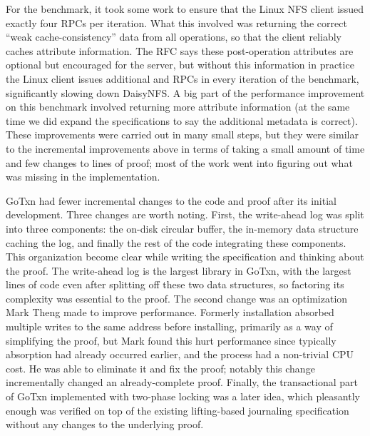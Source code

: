 For the  benchmark, it took some work to ensure that the Linux NFS
client issued exactly four RPCs per iteration. What this involved was returning
the correct ``weak cache-consistency'' data from all operations, so that the
client reliably caches attribute information. The RFC says these post-operation
attributes are optional but encouraged for the server, but without this
information in practice the Linux client issues additional  and
 RPCs in every iteration of the benchmark, significantly slowing down DaisyNFS.
A big part of the
performance improvement on this benchmark involved returning more
attribute information (at the same time we did expand the specifications to say
the additional metadata is correct). These improvements were carried out in many
small steps, but they were similar to the incremental improvements above in
terms of taking a small amount of time and few changes to lines of proof; most
of the work went into figuring out what was missing in the implementation.

GoTxn had fewer incremental changes to the code and proof after its initial
development. Three changes are worth noting. First, the write-ahead log was
split into three components: the on-disk circular buffer, the in-memory data
structure caching the log, and finally the rest of the code integrating these
components. This organization become clear while writing the specification and
thinking about the proof. The write-ahead log is the largest library in
GoTxn, with the largest lines of code even after splitting off these two data
structures, so factoring its complexity was essential to the proof. The second
change was an optimization Mark Theng made to improve performance. Formerly installation
absorbed multiple writes to the same address before installing, primarily as a way of
simplifying the proof, but Mark found this hurt performance since typically absorption had already occurred earlier, and the process had a non-trivial CPU cost. He was able to
eliminate it and fix the proof; notably this change incrementally changed an
already-complete proof. Finally, the transactional part of GoTxn implemented
with two-phase locking was a later idea,
which pleasantly enough was verified on top of the existing lifting-based
journaling specification without any changes to the underlying proof.

